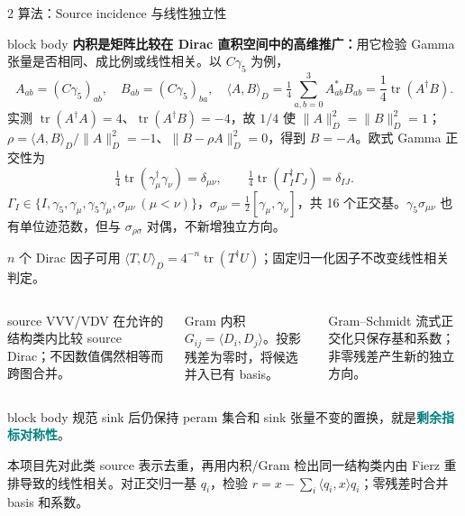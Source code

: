 \documentclass[aspectratio=169,UTF8,fontset=fandol]{ctexbeamer}
\newcommand{\kw}[1]{\textcolor{Teal}{\textbf{#1}}}
\begin{document}
\begin{frame}[t]{2 算法：Source incidence 与线性独立性}
\fontsize{7.3}{8.6}\selectfont
{}
\setlength{\abovedisplayskip}{2pt}
\setlength{\belowdisplayskip}{2pt}
\begin{beamercolorbox}[sep=0.4em,wd=\linewidth]{block body}
\textbf{内积是矩阵比较在 Dirac 直积空间中的高维推广：}用它检验 Gamma 张量是否相同、成比例或线性相关。以 \(C\gamma_5\) 为例，
\[
A_{ab}=(C\gamma_5)_{ab},\quad B_{ab}=(C\gamma_5)_{ba},\quad
\langle A,B\rangle_D=\tfrac14\textstyle\sum_{a,b=0}^{3}A_{ab}^{*}B_{ab}
=\frac14\operatorname{tr}(A^\dagger B).
\]
实测 \(\operatorname{tr}(A^\dagger A)=4\)、\(\operatorname{tr}(A^\dagger B)=-4\)，故 \(1/4\) 使 \(\|A\|_D^2=\|B\|_D^2=1\)；\(\rho=\langle A,B\rangle_D/\|A\|_D^2=-1\)、\(\|B-\rho A\|_D^2=0\)，得到 \(B=-A\)。欧式 Gamma 正交性为
\[
\tfrac14\operatorname{tr}(\gamma_\mu^\dagger\gamma_\nu)=\delta_{\mu\nu},\qquad
\tfrac14\operatorname{tr}(\Gamma_I^\dagger\Gamma_J)=\delta_{IJ}.
\]
\(\Gamma_I\in\{I,\gamma_5,\gamma_\mu,\gamma_5\gamma_\mu,\sigma_{\mu\nu}\ (\mu<\nu)\}\)，\(\sigma_{\mu\nu}=\tfrac12[\gamma_\mu,\gamma_\nu]\)，共 16 个正交基。\(\gamma_5\sigma_{\mu\nu}\) 也有单位迹范数，但与 \(\sigma_{\rho\sigma}\) 对偶，不新增独立方向。
\end{beamercolorbox}
\vspace{0.15em}
\(n\) 个 Dirac 因子可用 \(\langle T,U\rangle_D=4^{-n}\operatorname{tr}(T^\dagger U)\)；固定归一化因子不改变线性相关判定。
\begin{columns}[T,onlytextwidth]
\begin{block}{source VVV/VDV}
\fontsize{7.3}{8.6}\selectfont
在允许的结构类内比较 source Dirac；不因数值偶然相等而跨图合并。
\end{block}
\begin{block}{Gram 内积}
\fontsize{7.3}{8.6}\selectfont
\(G_{ij}=\langle D_i,D_j\rangle\)。投影残差为零时，将候选并入已有 basis。
\end{block}
\begin{block}{Gram--Schmidt}
\fontsize{7.3}{8.6}\selectfont
流式正交化只保存基和系数；非零残差产生新的独立方向。
\end{block}
\end{columns}
\vspace{0.2em}
\begin{beamercolorbox}[sep=0.4em,wd=\linewidth]{block body}
\fontsize{7.3}{8.6}\selectfont
规范 sink 后仍保持 peram 集合和 sink 张量不变的置换，就是\kw{剩余指标对称性}。
\par\smallskip
本项目先对此类 source 表示去重，再用内积/Gram 检出同一结构类内由 Fierz 重排导致的线性相关。对正交归一基 \(q_i\)，检验 \(r=x-\sum_i\langle q_i,x\rangle q_i\)；零残差时合并 basis 和系数。
\end{beamercolorbox}
\end{frame}
\end{document}
